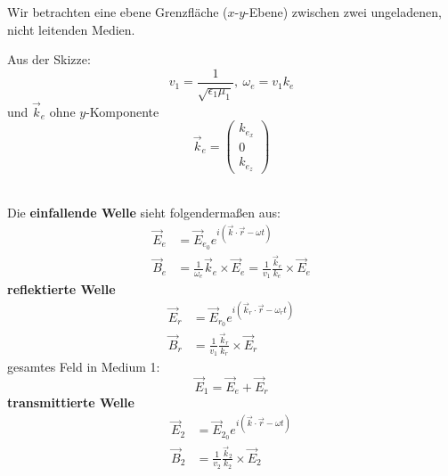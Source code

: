 Wir betrachten eine ebene Grenzfläche ($ x $-$ y $-Ebene) zwischen zwei ungeladenen, nicht leitenden Medien.\\
\begin{minipage}{.55\linewidth}
	Aus der Skizze:
	\begin{equation*}
	v_1 = \frac{1}{\sqrt{\epsilon_1 \mu_1}} , \ \omega_e = v_1 k_e
	\end{equation*}
	und $ \vec{k}_e $ ohne $ y $-Komponente
	\begin{equation*}
	\vec{k}_e = \begin{pmatrix}
	k_{e_x} \\ 0 \\ k_{e_z}
	\end{pmatrix}
	\end{equation*}
\end{minipage}%
\begin{minipage}{.45\linewidth}
	\vspace{5pt}
\end{minipage}%
\\
Die \textbf{einfallende Welle} sieht folgendermaßen aus:
\begin{align*}
\vec{E}_e &= \vec{E}_{e_0} e^{i(\vec{k} \cdot \vec{r} - \omega t)}\\
\vec{B}_e &= \frac{1}{\omega_e} \vec{k}_e \times \vec{E}_e = \frac{1}{v_1} \frac{\vec{k}_e}{k_e} \times \vec{E}_e
\end{align*}
\textbf{reflektierte Welle}
\begin{align*}
\vec{E}_r &= \vec{E}_{r_0} e^{i(\vec{k}_r \cdot \vec{r} - \omega_r t)} \\
\vec{B}_r &= \frac{1}{v_1} \frac{\vec{k}_r}{k_r} \times \vec{E}_r
\end{align*}
gesamtes Feld in Medium 1:
\begin{equation*}
\vec{E}_1 = \vec{E}_e + \vec{E}_r
\end{equation*}
\textbf{transmittierte Welle}
\begin{align*}
\vec{E}_2 &= \vec{E}_{2_0} e^{i(\vec{k} \cdot \vec{r} - \omega t)} \\
\vec{B}_2 &= \frac{1}{v_2} \frac{\vec{k}_2}{k_2} \times \vec{E}_2
\end{align*}

